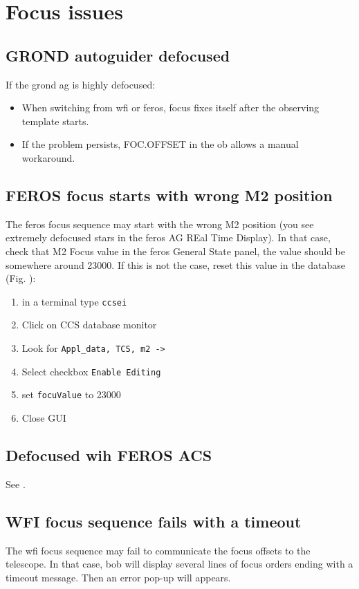 \documentclass[11pt,fleqn,a4paper]{book}
\begin{document}
\section{Focus issues}

\subsection{GROND autoguider defocused}

If the \gls{grond} \gls{ag} is highly defocused:
\begin{itemize}
  \item When switching from \gls{wfi} or \gls{feros}, \gls{focus} fixes itself after the observing \gls{template} starts.
  \item If the problem persists, FOC.OFFSET in the \gls{ob} allows a manual workaround.
\end{itemize}

\subsection{FEROS focus starts with wrong M2 position}
The \gls{feros} \gls{focus} sequence may start with the wrong M2 position (you see extremely defocused stars in the \gls{feros} AG REal Time Display). In that case, check that M2 Focus value in the \gls{feros} General State panel, the value should be somewhere around 23000. If this is not the case, reset this value in the database (Fig. ): 

\label{proc:ferosfocusstartvalue}
\begin{enumerate}
	\item in a terminal type \texttt{ccsei}
	\item Click on CCS database monitor
	\item Look for \texttt{Appl\_data, TCS, m2 ->} 
	\item Select checkbox \texttt{Enable Editing}
	\item set \texttt{focuValue} to 23000
	\item Close GUI
\end{enumerate} 

\subsection{Defocused wih FEROS ACS}

See .

\subsection{WFI focus sequence fails with a timeout}
\label{sec:wfifocseqtimeout}
The \gls{wfi} \gls{focus} sequence may fail to communicate the focus offsets to the telescope.  In that case, \gls{bob} will display several lines of focus orders ending with a timeout message. Then an error pop-up will appears.
\end{document}
